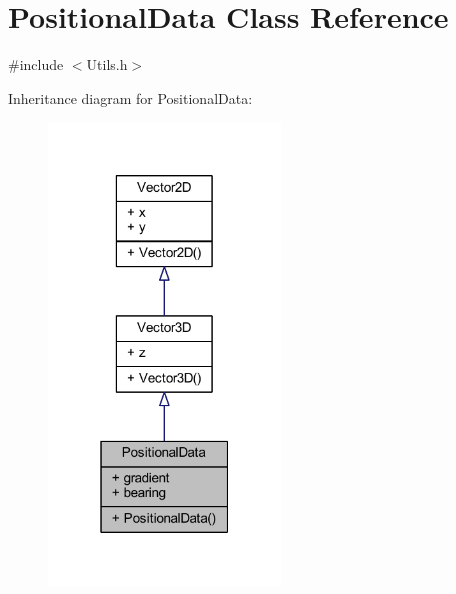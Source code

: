 \hypertarget{class_positional_data}{}\section{Positional\+Data Class Reference}
\label{class_positional_data}


{\ttfamily \#include $<$Utils.\+h$>$}



Inheritance diagram for Positional\+Data\+:
\nopagebreak
\begin{figure}[H]
\begin{center}
\leavevmode
\includegraphics[width=175pt]{class_positional_data__inherit__graph}
\end{center}
\end{figure}


